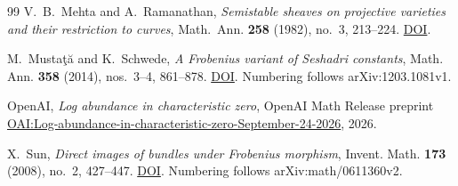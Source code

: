 \documentclass[12pt,a4paper,psamsfonts]{amsart}
\theoremstyle{definition}
\theoremstyle{plain}
\begin{document}
\begin{thebibliography}{99}
V.~B.~Mehta and A.~Ramanathan,
\emph{Semistable sheaves on projective varieties and their restriction to curves},
Math.~Ann. \textbf{258} (1982), no.~3, 213--224.
\href{https://doi.org/10.1007/BF01450677}{DOI}.

M.~Musta\c{t}\u{a} and K.~Schwede,
\emph{A Frobenius variant of Seshadri constants},
Math. Ann. \textbf{358} (2014), nos.~3--4, 861--878.
\href{https://doi.org/10.1007/s00208-013-0976-4}{DOI}.
Numbering follows arXiv:1203.1081v1.

OpenAI,
\emph{Log abundance in characteristic zero},
OpenAI Math Release preprint
\href{https://github.com/openai/math/blob/main/preprints/Log-abundance-in-characteristic-zero-September-24-2026/paper.pdf}{OAI:Log-abundance-in-characteristic-zero-September-24-2026},
2026.

X.~Sun,
\emph{Direct images of bundles under Frobenius morphism},
Invent. Math. \textbf{173} (2008), no.~2, 427--447.
\href{https://doi.org/10.1007/s00222-008-0125-y}{DOI}.
Numbering follows arXiv:math/0611360v2.
\end{thebibliography}
\end{document}
